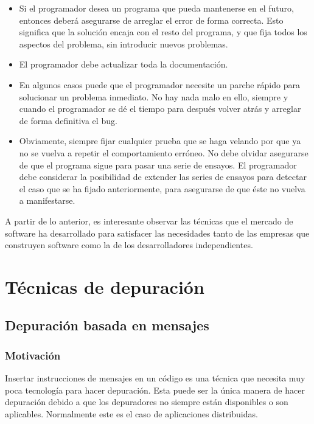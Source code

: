 \documentclass[12pt,legalpaper]{report}
\begin{document}
\begin{itemize}
    \item Si el programador desea un programa que pueda mantenerse en el futuro, entonces deberá asegurarse de arreglar el error de forma correcta. Esto significa que la solución encaja con el resto del programa, y que fija todos los aspectos del problema, sin introducir nuevos problemas. 

    \item El programador debe actualizar toda la documentación. 

    \item En algunos casos puede que el programador necesite un parche rápido para solucionar un problema inmediato. No hay nada malo en ello, siempre y cuando el programador se dé el tiempo para después volver atrás y arreglar de forma definitiva el bug. 

    \item Obviamente, siempre fijar cualquier prueba que se haga velando por que ya no se vuelva a repetir el comportamiento erróneo. No debe olvidar asegurarse de que el programa sigue para pasar una serie de ensayos. El programador debe considerar la posibilidad de extender las series de ensayos para detectar el caso que se ha fijado anteriormente, para asegurarse de que éste no vuelva a manifestarse.
\end{itemize}

A partir de lo anterior, es interesante observar las técnicas que el mercado de software ha desarrollado para satisfacer las necesidades tanto de las empresas que construyen software como la de los desarrolladores independientes.


	\section{Técnicas de depuración}
		\subsection{Depuración basada en mensajes}
			\subsubsection{Motivación}
			
Insertar instrucciones de mensajes en un código es una técnica que necesita muy poca tecnología para hacer depuración.  Esta puede ser la única manera de hacer depuración debido a que los depuradores no siempre están disponibles o son aplicables. Normalmente este es el caso de aplicaciones distribuidas.
\end{document}
